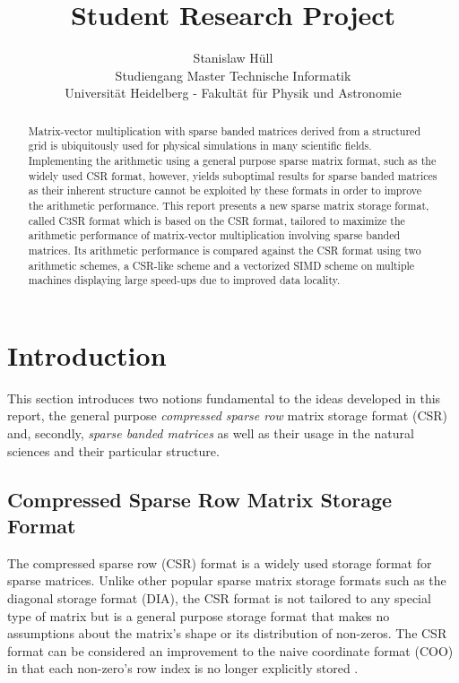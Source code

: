 \documentclass{article}
\author{Stanislaw Hüll\\\small{Studiengang Master Technische Informatik}\\\small{Universität Heidelberg - Fakultät für Physik und Astronomie}}
\title{Student Research Project}
\begin{document}
\maketitle

\begin{abstract}
  Matrix-vector multiplication with sparse banded matrices derived from a structured grid is ubiquitously used for physical simulations in many scientific fields. Implementing the arithmetic using a general purpose sparse matrix format, such as the widely used CSR format, however, yields suboptimal results for sparse banded matrices as their inherent structure cannot be exploited by these formats in order to improve the arithmetic performance. This report presents a new sparse matrix storage format, called C3SR format which is based on the CSR format, tailored to maximize the arithmetic performance of matrix-vector multiplication involving sparse banded matrices. Its arithmetic performance is compared against the CSR format using two arithmetic schemes, a CSR-like scheme and a vectorized SIMD scheme on multiple machines displaying large speed-ups due to improved data locality.
\end{abstract}

\newpage
\tableofcontents
\newpage
\listoffigures
\newpage
\section{Introduction}

  This section introduces two notions fundamental to the ideas developed in this report, the general purpose \emph{compressed sparse row} matrix storage format (CSR) and, secondly, \emph{sparse banded matrices} as well as their usage in the natural sciences and their particular structure.

  \subsection{Compressed Sparse Row Matrix Storage Format}

    The compressed sparse row (CSR) format is a widely used storage format for sparse matrices. Unlike other popular sparse matrix storage formats such as the diagonal storage format (DIA), the CSR format is not tailored to any special type of matrix but is a general purpose storage format that makes no assumptions about the matrix's shape or its distribution of non-zeros. The CSR format can be considered an improvement to the naive coordinate format (COO) in that each non-zero's row index is no longer explicitly stored \cite{Bell2011}.
\end{document}
